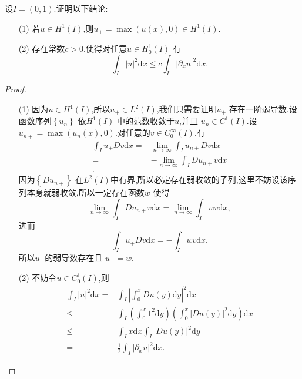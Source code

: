 \begin{exercise}
  设$I=(0,1)$.证明以下结论:
  \begin{enumerate}
    \item [(1)] 若$u\in H^{1}(I)$,则$u_{+}=\max(u(x),0)\in H^{1}(I)$.
    \item [(2)] 存在常数$c>0$,使得对任意$u\in H^{1}_0(I)$ 有
      \[
      \int_{I}|u|^2\mathrm{d}x\le c \int_{I}|\partial_xu|^2\mathrm{d}x.
      \] 
  \end{enumerate}
\end{exercise}
 
\begin{proof}
  \begin{enumerate}
    \item [(1)] 因为$u\in H^{1}(I)$,所以$u_{+}\in L^2(I)$,我们只需要证明$u_{+}$ 存在一阶弱导数.设函数序列$\left\{u_n\right\} $ 依$H^{1}(I)$ 中的范数收敛于$u$,并且 $u_n\in C^{1}(I)$.设$u_{n+}=\max(u_n(x),0)$.对任意的$v\in C_0^{\infty}(I)$,有
      \begin{align*}
	\int_{I}u_{+}Dv\mathrm{d}x=&\lim_{n\to \infty} \int_{I}u_{n+}Dv\mathrm{d}x\\
	=& -\lim_{n\to \infty}\int_{I}Du_{n+}v\mathrm{d}x\\
      .\end{align*}
      因为$\left\{Du_{n+}\right\} $ 在$L^2(I)$中有界,所以必定存在弱收敛的子列,这里不妨设该序列本身就弱收敛,所以一定存在函数$w$ 使得
      \[
      \lim_{n\to \infty}\int_{I}Du_{n+}v\mathrm{d}x=\lim_{n\to \infty}\int_I w v\mathrm{d}x,
      \] 
      进而
      \[
      \int_{I}u_+ Dv\mathrm{d}x=-\int_I w v\mathrm{d}x.
      \] 
      所以$u_+$的弱导数存在且 $u_{+}=w$.
    \item [(2)] 不妨令$u\in C_0^{1}(I)$,则
      \begin{align*}
	\int_{I}|u|^2\mathrm{d}x= & \int_{I} \left| \int_0^{x} Du(y)\mathrm{d}y\right|^2\mathrm{d}x\\
	\le & \int_{I}\left(\int_0^{x}1^2\mathrm{d}y\right)\left( \int_0^{x}|Du(y)|^2\mathrm{d}y \right) \mathrm{d}x\\
	\le & \int_I x\mathrm{d}x \int_I|Du(y)|^2\mathrm{d}y \\
	= & \frac{1}{2}\int_{I}|\partial_x u|^2\mathrm{d}x
      .\end{align*}
  \end{enumerate}
\end{proof}
